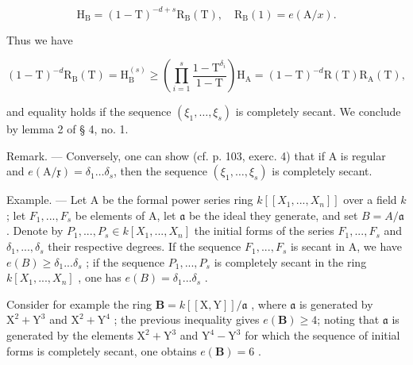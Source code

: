 \[
\mathrm{H} _ {\mathrm{B}} = (1 - \mathrm{T}) ^ {- d + s} \mathrm{R} _ {\mathrm{B}} (\mathrm{T}), \quad \mathrm{R} _ {\mathrm{B}} (1) = e (\mathrm{A} / x).
\]

Thus we have

\[
(1 - \mathrm{T}) ^ {- d} \mathrm{R} _ {\mathrm{B}} (\mathrm{T}) = \mathrm{H} _ {\mathrm{B}} ^ {(s)} \geqslant \left(\prod_ {i = 1} ^ {s} \frac {1 - \mathrm{T} ^ {\delta_ {i}}}{1 - \mathrm{T}}\right) \mathrm{H} _ {\mathrm{A}} = (1 - \mathrm{T}) ^ {- d} \mathrm{R} (\mathrm{T}) \mathrm{R} _ {\mathrm{A}} (\mathrm{T}),
\]

and equality holds if the sequence \((\xi_{1},\ldots,\xi_{s})\) is completely secant. We conclude by lemma 2 of § 4, no. 1.

Remark. --- Conversely, one can show (cf. p. 103, exerc. 4) that if A is regular and \(e(\mathrm{A}/\mathfrak{x})=\delta_{1}\ldots\delta_{s}\), then the sequence \((\xi_{1},\ldots,\xi_{s})\) is completely secant.

Example. --- Let A be the formal power series ring \(k[[X_1, ..., X_n]]\) over a field \(k\); let \(F_1, ..., F_s\) be elements of A, let \(\mathfrak{a}\) be the ideal they generate, and set \(B = A/\mathfrak{a}\). Denote by \(P_1, ..., P_s \in k[X_1, ..., X_n]\) the initial forms of the series \(F_1, ..., F_s\) and \(\delta_1, ..., \delta_s\) their respective degrees. If the sequence \(F_1, ..., F_s\) is secant in A, we have \(e(B) \geqslant \delta_1 ... \delta_s\) ; if the sequence \(P_1, ..., P_s\) is completely secant in the ring \(k[X_1, ..., X_n]\) , one has \(e(B) = \delta_1 ... \delta_s\) .

Consider for example the ring \(\mathbf{B} = k[[\mathrm{X},\mathrm{Y}]] / \mathfrak{a}\) , where \(\mathfrak{a}\) is generated by \(\mathrm{X}^2 + \mathrm{Y}^3\) and \(\mathrm{X}^2 + \mathrm{Y}^4\) ; the previous inequality gives \(e(\mathbf{B})\geqslant 4\); noting that \(\mathfrak{a}\) is generated by the elements \(\mathrm{X}^2 + \mathrm{Y}^3\) and \(\mathrm{Y}^4 -\mathrm{Y}^3\) for which the sequence of initial forms is completely secant, one obtains \(e(\mathbf{B}) = 6\) .
\relax{}

